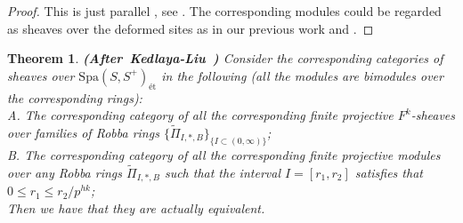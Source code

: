 \documentclass[12pt]{amsart}
\newtheorem{theorem}{Theorem}[section]
\theoremstyle{definition}
\numberwithin{equation}{section}
\begin{document}
\begin{proof}
This is just parallel \cite[Theorem 4.6.1]{KL2}, see \cite[Theorem 4.11]{XT2}. The corresponding modules could be regarded as sheaves over the deformed sites as in our previous work \cite{XT3} and \cite{XT4}.	
\end{proof}



\begin{theorem}\mbox{\bf{(After Kedlaya-Liu \cite[Theorem 4.6.1]{KL2})}}
Consider the corresponding categories of sheaves over $\mathrm{Spa}(S,S^+)_{\text{\'et}}$ in the following (all the modules are bimodules over the corresponding rings):\\
A. The corresponding category of all the corresponding finite projective $F^k$-sheaves over families of Robba rings $\{\widetilde{\Pi}_{I,*,B}\}_{\{I\subset (0,\infty)\}}$;\\
B. The corresponding category of all the corresponding finite projective modules over any Robba rings $\widetilde{\Pi}_{I,*,B}$ such that the interval $I=[r_1,r_2]$ satisfies that $0\leq r_1 \leq r_2/p^{hk}$;\\
Then we have that they are actually equivalent.


\end{theorem}
\end{document}
